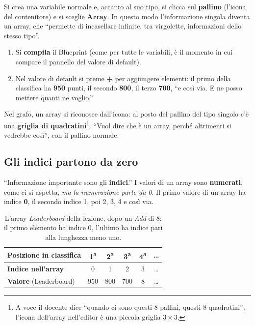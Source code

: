 Si crea una variabile normale e, accanto al suo tipo, si clicca sul
\textbf{pallino} (l'icona del contenitore) e si sceglie \textbf{Array}. In
questo modo l'informazione singola diventa un array, che ``permette di
incasellare infinite, tra virgolette, informazioni dello stesso tipo''.
\begin{enumerate}
  \item Si \textbf{compila} il Blueprint (come per tutte le variabili, è il
        momento in cui compare il pannello del valore di default).
  \item Nel valore di default si preme \textbf{+} per aggiungere elementi:
        il primo della classifica ha \textbf{950} punti, il secondo
        \textbf{800}, il terzo \textbf{700}, ``e così via. E ne posso mettere
        quanti ne voglio.''
\end{enumerate}
Nel grafo, un array si riconosce dall'icona: al posto del pallino del tipo
singolo c'è una \textbf{griglia di quadratini}\footnote{A voce il docente dice
``quando ci sono questi 8 pallini, questi 8 quadratini''; l'icona dell'array
nell'editor è una piccola griglia $3 \times 3$.}. ``Vuol dire che è un array,
perché altrimenti si vedrebbe così'', con il pallino normale.

\subsection{Gli indici partono da zero}

``Informazione importante sono gli \textbf{indici}.'' I valori di un array
sono \textbf{numerati}, come ci si aspetta, \emph{ma la numerazione parte da
0}. Il primo valore di un array ha indice \textbf{0}, il secondo indice 1, poi
2, 3, 4 e così via.

\begin{table}[htbp]
\centering
\begin{tabular}{lccccc}
\toprule
\textbf{Posizione in classifica} & 1\textsuperscript{a} & 2\textsuperscript{a}
  & 3\textsuperscript{a} & 4\textsuperscript{a} & \dots \\
\midrule
\textbf{Indice nell'array} & 0 & 1 & 2 & 3 & \dots \\
\textbf{Valore} (Leaderboard) & 950 & 800 & 700 & 8 & \dots \\
\bottomrule
\end{tabular}
\caption{L'array \emph{Leaderboard} della lezione, dopo un \emph{Add} di 8: il
primo elemento ha indice 0, l'ultimo ha indice pari alla lunghezza meno uno.}
\label{gd12:tab:indici}
\end{table}

